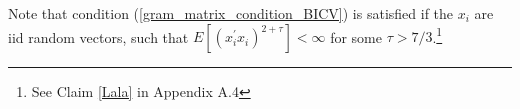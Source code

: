 \documentclass[Research_Module_ES.tex]{subfiles}
\begin{document}
Note that condition (\ref{gram_matrix_condition_BICV}) is satisfied if the $x_i$ are iid random vectors, such that $E[(x_i^\prime x_i)^{2+\tau}]<\infty$ for some $\tau>7/3$.\footnote{See Claim \ref{Lala} in Appendix A.4}

\end{document}
